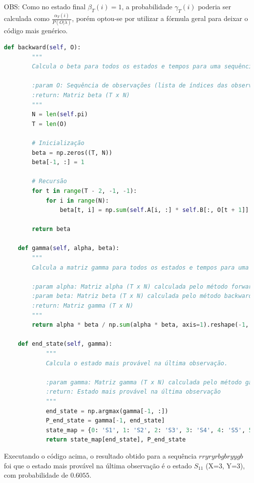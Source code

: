 \begin{itemize}
\begin{tcolorbox}[title=Resposta:]
        OBS: Como no estado final $\beta_T(i) = 1$, a probabilidade $\gamma_T(i)$ poderia ser calculada como $\frac{\alpha_T(i)}{P(O | \lambda)}$, porém optou-se por utilizar a fórmula geral para deixar o código mais genérico.
    
    \end{tcolorbox}    
    
    \begin{lstlisting}[language=Python, caption={backward, gamma e end\_state}, label={lst:end_state}]
    def backward(self, O):
        """
        Calcula o beta para todos os estados e tempos para uma sequência O.

        :param O: Sequência de observações (lista de índices das observações)
        :return: Matriz beta (T x N)
        """
        N = len(self.pi)
        T = len(O)

        # Inicialização
        beta = np.zeros((T, N))
        beta[-1, :] = 1

        # Recursão
        for t in range(T - 2, -1, -1):
            for i in range(N):
                beta[t, i] = np.sum(self.A[i, :] * self.B[:, O[t + 1]] * beta[t + 1, :])

        return beta
    
    def gamma(self, alpha, beta):
        """
        Calcula a matriz gamma para todos os estados e tempos para uma sequência O.
        
        :param alpha: Matriz alpha (T x N) calculada pelo método forward
        :param beta: Matriz beta (T x N) calculada pelo método backward
        :return: Matriz gamma (T x N)
        """
        return alpha * beta / np.sum(alpha * beta, axis=1).reshape(-1, 1)

    def end_state(self, gamma):
            """
            Calcula o estado mais provável na última observação.
            
            :param gamma: Matriz gamma (T x N) calculada pelo método gamma
            :return: Estado mais provável na última observação
            """
            end_state = np.argmax(gamma[-1, :])
            P_end_state = gamma[-1, end_state]
            state_map = {0: 'S1', 1: 'S2', 2: 'S3', 3: 'S4', 4: 'S5', 5: 'S6', 6: 'S7', 7: 'S8', 8: 'S9', 9: 'S10', 10: 'S11', 11: 'S12', 12: 'S13', 13: 'S14', 14: 'S15', 15: 'S16'}
            return state_map[end_state], P_end_state        
    \end{lstlisting}

    \begin{tcolorbox}[title=Resposta (continuação):]
        Executando o código acima, o resultado obtido para a sequência \( r r y r y r b g b r y y g b \) foi que o estado mais provável na última observação é o estado \( S_{11} \) (X=3, Y=3), com probabilidade de $0.6055$.
    \end{tcolorbox}


\end{itemize}
